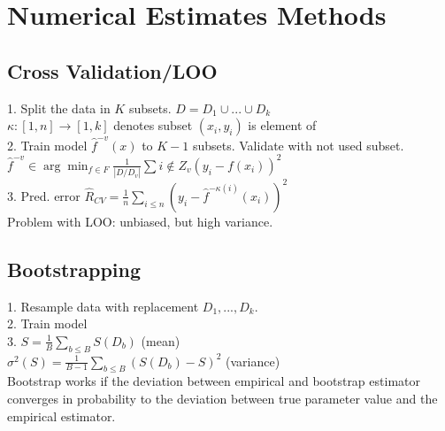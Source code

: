 \section{Numerical Estimates Methods}
\subsection*{Cross Validation/LOO}
1. Split the data in $K$ subsets. $D=D_1\cup ... \cup D_k$\\
$\kappa:[1,n] \rightarrow [1,k]$ denotes subset $(x_i,y_i)$ is element of\\
2. Train model $\hat{f}^{-v}(x)$ to $K-1$ subsets. Validate with not used subset.\\
$\hat{f}^{-v} \in \arg\min_{f\in F} \frac{1}{|D/D_v|}\sum{i\not \in Z_v}(y_i-f(x_i))^2$\\
3. Pred. error $\hat{R}_{CV} = \frac{1}{n} \sum_{i\leq n}(y_i - \hat{f}^{-\kappa(i)}(x_i))^2$\\
Problem with LOO: unbiased, but high variance.
\subsection*{Bootstrapping}
1. Resample data with replacement $D_1,...,D_k$.\\
2. Train model\\
3. $S = \frac{1}{B} \sum_{b \leq B} S(D_b)$ (mean)\\
$\sigma^2(S) = \frac{1}{B-1} \sum_{b \leq B} (S(D_b) -S)^2$ (variance)\\
Bootstrap works if the deviation between empirical and bootstrap estimator converges in probability to the
deviation between true parameter value and the empirical
estimator.